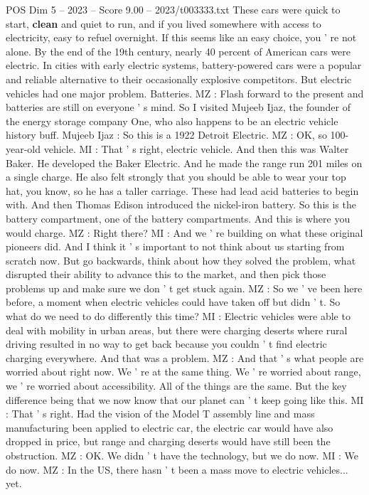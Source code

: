 \begin{textsample}{POS Dim 5 – 2023 – Score 9.00 – 2023/t003333.txt}
These cars were quick to start, \textbf{clean} and quiet to run, and if you lived somewhere with access to electricity, easy to refuel overnight.
If this seems like an easy choice, you ' re not alone.
By the end of the 19th century, nearly 40 percent of American cars were electric.
In cities with early electric systems, battery-powered cars were a popular and reliable alternative to their occasionally explosive competitors.
But electric vehicles had one major problem.
Batteries.
MZ : Flash forward to the present and batteries are still on everyone ' s mind.
So I visited Mujeeb Ijaz, the founder of the energy storage company One, who also happens to be an electric vehicle history buff.
Mujeeb Ijaz : So this is a 1922 Detroit Electric.
MZ : OK, so 100-year-old vehicle.
MI : That ' s right, electric vehicle.
And then this was Walter Baker.
He developed the Baker Electric.
And he made the range run 201 miles on a single charge.
He also felt strongly that you should be able to wear your top hat, you know, so he has a taller carriage.
These had lead acid batteries to begin with.
And then Thomas Edison introduced the nickel-iron battery.
So this is the battery compartment, one of the battery compartments.
And this is where you would charge.
MZ : Right there?
MI : And we ' re building on what these original pioneers did.
And I think it ' s important to not think about us starting from scratch now.
But go backwards, think about how they solved the problem, what disrupted their ability to advance this to the market, and then pick those problems up and make sure we don ' t get stuck again.
MZ : So we ' ve been here before, a moment when electric vehicles could have taken off but didn ' t.
So what do we need to do differently this time?
MI : Electric vehicles were able to deal with mobility in urban areas, but there were charging deserts where rural driving resulted in no way to get back because you couldn ' t find electric charging everywhere.
And that was a problem.
MZ : And that ' s what people are worried about right now.
We ' re at the same thing.
We ' re worried about range, we ' re worried about accessibility.
All of the things are the same.
But the key difference being that we now know that our planet can ' t keep going like this.
MI : That ' s right.
Had the vision of the Model T assembly line and mass manufacturing been applied to electric car, the electric car would have also dropped in price, but range and charging deserts would have still been the obstruction.
MZ : OK.
We didn ' t have the technology, but we do now.
MI : We do now.
MZ : In the US, there hasn ' t been a mass move to electric vehicles... yet.

\end{textsample}
